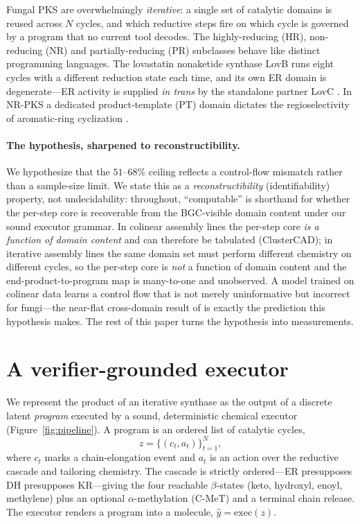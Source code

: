 \documentclass[11pt]{article}
\theoremstyle{definition}
\begin{document}
Fungal PKS are overwhelmingly \emph{iterative}: a single set of catalytic domains is reused
across $N$ cycles, and which reductive steps fire on which cycle is governed by a program that
no current tool decodes. The highly-reducing (HR), non-reducing (NR) and partially-reducing
(PR) subclasses behave like distinct programming languages. The lovastatin nonaketide synthase
LovB runs eight cycles with a different reduction state each time, and its own ER domain is
degenerate---ER activity is supplied \emph{in trans} by the standalone partner LovC
\citep{ma2009}. In NR-PKS a dedicated product-template (PT) domain dictates the regioselectivity
of aromatic-ring cyclization \citep{crawford2009}.

\paragraph{The hypothesis, sharpened to reconstructibility.} We hypothesize that the $51$--$68\%$
ceiling reflects a control-flow mismatch rather than a sample-size limit. We state this as a
\emph{reconstructibility} (identifiability) property, not undecidability: throughout, ``computable''
is shorthand for whether the per-step core is recoverable from the BGC-visible domain content under
our sound executor grammar. In colinear assembly lines the per-step core \emph{is a
function of domain content} and can therefore be tabulated (ClusterCAD); in iterative assembly
lines the same domain set must perform different chemistry on different cycles, so the per-step
core is \emph{not} a function of domain content and the end-product-to-program map is
many-to-one and unobserved. A model trained on colinear data learns a control flow that is not
merely uninformative but incorrect for fungi---the near-flat cross-domain result of
\citet{riedling2024} is exactly the prediction this hypothesis makes. The rest of this paper
turns the hypothesis into measurements.

\section{A verifier-grounded executor}
\label{sec:executor}

We represent the product of an iterative synthase as the output of a discrete latent
\emph{program} executed by a sound, deterministic chemical executor (Figure~\ref{fig:pipeline}).
A program is an ordered list of catalytic cycles,
\begin{equation}
z = \big\{(c_t, a_t)\big\}_{t=1}^{N},
\end{equation}
where $c_t$ marks a chain-elongation event and $a_t$ is an action over the reductive cascade
and tailoring chemistry. The cascade is strictly ordered---ER presupposes DH presupposes
KR---giving the four reachable $\beta$-states (keto, hydroxyl, enoyl, methylene) plus an
optional $\alpha$-methylation (C-MeT) and a terminal chain release. The executor renders a
program into a molecule, $\hat y = \mathrm{exec}(z)$.
\end{document}
